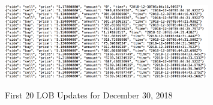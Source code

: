 \begin{figure}[t]
\begin{center}
\caption{First 20 LOB Updates for December 30, 2018}
\includegraphics[width=0.8\textwidth]{Figures/12_30_18_Updates.png}
\label{fig:12_30_18_Updates}
\end{center}
\end{figure}


